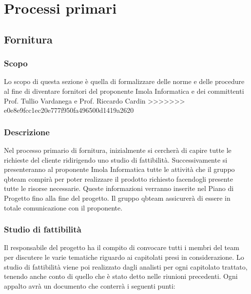 \section{Processi primari}
\subsection{Fornitura}
\subsubsection{Scopo}
Lo scopo di questa sezione è quella di formalizzare delle norme e delle procedure al fine di diventare fornitori del proponente Imola Informatica e dei committenti Prof. Tullio Vardanega e Prof. Riccardo Cardin 
>>>>>>> e0e8e9fcc1ec20e777f950fa496500d1419a2620


\subsubsection{Descrizione} 
Nel processo primario di fornitura, inizialmente si cercherà di capire tutte le richieste del cliente ridirigendo uno studio di fattibilità. 
Successivamente si presenteranno al proponente Imola Informatica tutte le attività che il gruppo qbteam compirà per poter realizzare il prodotto richiesto facendogli presente tutte le risorse necessarie. Queste informazioni verranno inserite nel Piano di Progetto fino alla fine del progetto.
Il gruppo qbteam assicurerà di essere in totale comunicazione con il proponente.


\subsubsection{Studio di fattibilità}

Il responsabile del progetto ha il compito di convocare tutti i membri del team per discutere le varie tematiche riguardo ai capitolati presi in considerazione.
Lo studio di fattibilità viene poi realizzato dagli analisti per ogni capitolato trattato, tenendo anche conto di quello che è stato detto nelle riunioni precedenti. Ogni appalto avrà un documento che conterrà i seguenti punti:

